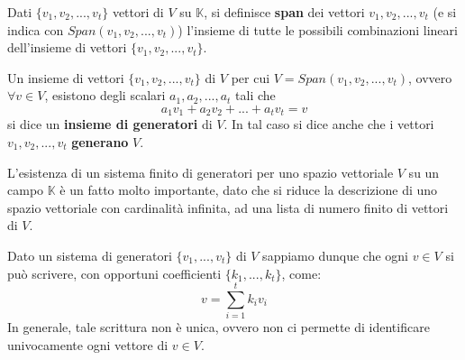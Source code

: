 \begin{defn}
	Dati $\{v_1, v_2, ..., v_t\}$ vettori di $V$ su $\mathbb{K}$,
	si definisce \textbf{span} dei vettori $v_1, v_2, ..., v_t$
	(e si indica con $Span(v_1, v_2, ..., v_t)$) l'insieme di tutte
	le possibili combinazioni lineari dell'insieme di vettori
	$\{v_1, v_2, ..., v_t\}$.
\end{defn}

\begin{defn}
	Un insieme di vettori $\{v_1, v_2, ..., v_t\}$ di $V$ per cui
	$V = Span(v_1, v_2, ..., v_t)$, ovvero $\forall v \in V$, esistono
	degli scalari $a_1, a_2, ..., a_t$ tali che
	\begin{equation*}
		a_1 v_1 + a_2 v_2 + ... + a_t v_t = v
	\end{equation*}
	si dice un \textbf{insieme di generatori} di $V$. In tal caso si dice
	anche che i vettori $v_1, v_2, ..., v_t$ \textbf{generano} $V$.
\end{defn}

L'esistenza di un sistema finito di generatori per uno spazio vettoriale
$V$ su un campo $\mathbb{K}$ \`e un fatto molto importante, dato che
si riduce la descrizione di uno spazio vettoriale con cardinalit\`a
infinita, ad una lista di numero finito di vettori di $V$.


Dato un sistema di generatori $\{v_1, ..., v_t\}$ di $V$ sappiamo dunque
che ogni $v \in V$ si pu\`o scrivere, con opportuni coefficienti
$\{k_1, ..., k_t\}$, come:
\begin{equation*}
	v = \sum_{i=1}^t k_i v_i
\end{equation*}
In generale, tale scrittura non \`e unica, ovvero non ci permette di
identificare univocamente ogni vettore di $v \in V$.

